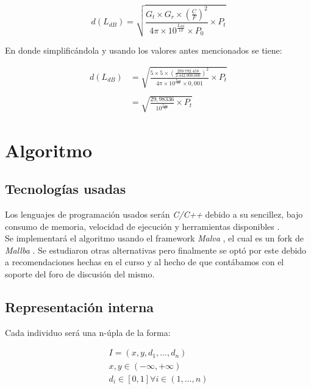 \documentclass[journal]{IEEEtran}
\begin{document}
$$d(L_{dB}) = \sqrt {\frac {G_t \times G_r \times (\frac {C} {F})^2} {4 \pi \times 10^{\frac {L_{dB}} {10}} \times P_0} \times P_t}$$

En donde simplificándola y usando los valores antes mencionados se tiene:

\begin{equation*}
\begin{split}
d(L_{dB}) &= \sqrt {\frac {5 \times 5 \times (\frac {299.792.458} {2.442.000.000})^2} {4 \pi \times 10^{\frac {L_{dB}} {10}} \times 0,001} \times P_t}\\\\
&= \sqrt {\frac {29,98336} {10^{\frac {L_{dB}} {10}}} \times P_t}
\end{split}
\end{equation*}

\section{Algoritmo}

\subsection{Tecnologías usadas}

Los lenguajes de programación usados serán \emph{C/C++} \cite{c:c++:language} debido a su sencillez, bajo consumo de memoria, velocidad de ejecución y herramientas disponibles \cite{why:c:c++}.\\

Se implementará el algoritmo usando el framework \emph{Malva} \cite{malva}, el cual es un fork de \emph{Mallba} \cite{mallba}. Se estudiaron otras alternativas pero finalmente se optó por este debido a recomendaciones hechas en el curso y al hecho de que contábamos con el soporte del foro de discusión del mismo.\\

\subsection{Representación interna}

Cada individuo será una n-úpla de la forma:

\begin{gather*}
I = (x, y, d_1, \dots, d_n)\\
x, y \in (-\infty, +\infty)\\
d_i \in [0, 1] \forall i \in (1, \dots, n)
\end{gather*}
\end{document}

